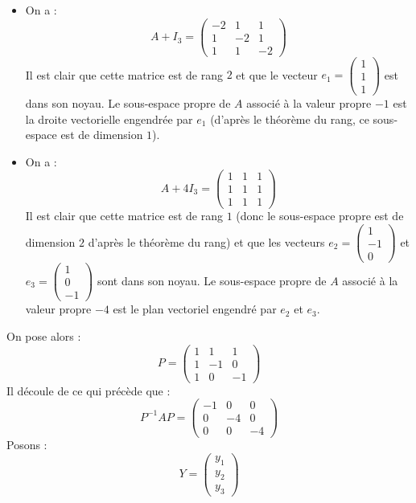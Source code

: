 \documentclass[a4paper,twoside,french,11pt]{VcCours}
\begin{document}
\begin{itemize}
\item On a :
$$A + I_3 = \left(\begin{array}{ccc} -2 & 1 & 1 \\ 1 & -2 & 1 \\ 1 & 1 & -2 \end{array}\right)$$
Il est clair que cette matrice est de rang $2$ et que le vecteur $e_1 = \left(\begin{array}{ccc} 1 \\ 1 \\ 1 \end{array}\right)$ est dans son noyau. Le sous-espace propre de $A$ associé à la valeur propre $-1$ est la droite vectorielle engendrée par $e_1$ (d'après le théorème du rang, ce sous-espace est de dimension $1$).
\item On a :
$$A + 4I_3 = \left(\begin{array}{ccc} 1 & 1 & 1 \\ 1 & 1 & 1 \\ 1 & 1 & 1 \end{array}\right)$$
Il est clair que cette matrice est de rang $1$ (donc le sous-espace propre est de dimension $2$ d'après le théorème du rang) et que les vecteurs $e_2 = \left(\begin{array}{ccc} 1 \\ -1 \\ 0 \end{array}\right)$ et $e_3 = \left(\begin{array}{ccc} 1 \\ 0 \\ -1 \end{array}\right)$ sont dans son noyau. Le sous-espace propre de $A$ associé à la valeur propre $-4$ est le plan vectoriel engendré par $e_2$ et $e_3$.
\end{itemize}
On pose alors :
$$P = \left(\begin{array}{ccc} 1 & 1 & 1 \\ 1 & -1 & 0 \\ 1 & 0 & -1 \end{array}\right)$$
Il découle de ce qui précède que : 
$$P^{-1} A P = \left(\begin{array}{ccc} -1 & 0 & 0 \\ 0 & -4 & 0 \\ 0 & 0 & -4 \end{array}\right)$$
Posons :
$$Y = \left(\begin{array}{c} y_1 \\ y_2 \\ y_3\end{array}\right)$$
\end{document}
